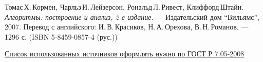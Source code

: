 \documentclass[pdf, unicode, 12pt, a4paper,oneside,fleqn]{article}
\begin{document}
\begin{thebibliography}{99}

    Томас\,Х.\,Кормен, Чарльз\,И.\,Лейзерсон, Рональд\,Л.\,Ривест, Клиффорд\,Штайн.
    {\itshape Алгоритмы: построение и анализ, 2-е издание.} --- Издательский дом \enquote{Вильямс}, 2007. Перевод с английского: И.\,В.\,Красиков, Н.\,А.\,Орехова, В.\,Н.\,Романов. --- 1296 с. (ISBN 5-8459-0857-4 (рус.))

    \href{http://www.ifap.ru/library/gost/7052008.pdf}{Список использованных источников оформлять нужно по  ГОСТ Р 7.05-2008}
    
    \end{thebibliography}
    \pagebreak
\end{document}

